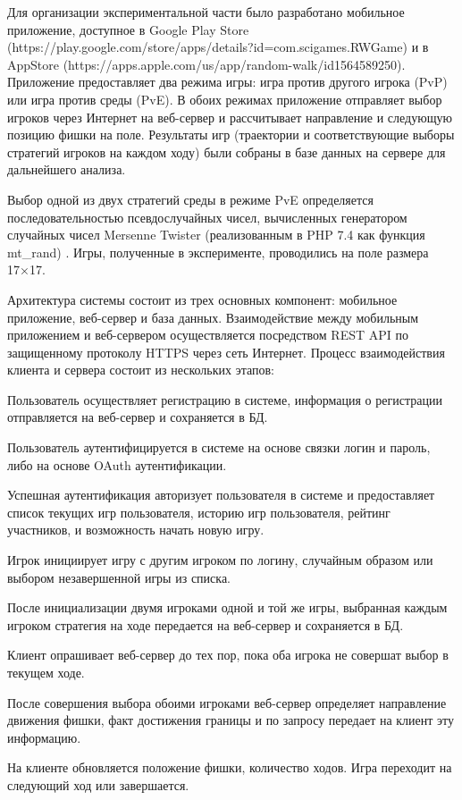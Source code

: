 Для организации экспериментальной части было разработано мобильное приложение, 
доступное в Google Play Store (https://play.google.com/store/apps/details?id=com.scigames.RWGame) и 
в AppStore (https://apps.apple.com/us/app/random-walk/id1564589250). Приложение предоставляет два режима игры: 
игра против другого игрока (PvP) или игра против среды (PvE). В обоих режимах приложение отправляет выбор игроков 
через Интернет на веб-сервер и рассчитывает направление и следующую позицию фишки на поле. Результаты игр 
(траектории и соответствующие выборы стратегий игроков на каждом ходу) были собраны в базе данных на сервере для дальнейшего анализа.

Выбор одной из двух стратегий среды в режиме PvE определяется последовательностью псевдослучайных чисел, 
вычисленных генератором случайных чисел Mersenne Twister (реализованным в PHP 7.4 как функция mt_rand) \cite{}. 
Игры, полученные в эксперименте, проводились на  поле размера 17×17.

Архитектура системы состоит из трех основных компонент: мобильное приложение, веб-сервер и база данных.
Взаимодействие между мобильным приложением и веб-сервером осуществляется посредством REST API по защищенному протоколу HTTPS
через сеть Интернет. Процесс взаимодействия клиента и сервера состоит из нескольких этапов:
\item Пользователь осуществляет регистрацию в системе, информация о регистрации отправляется на веб-сервер и сохраняется в БД.
\item Пользователь аутентифицируется в системе на основе связки логин и пароль, либо на основе OAuth аутентификации.
\item Успешная аутентификация авторизует пользователя в системе и предоставляет список текущих игр пользователя, историю игр пользователя, рейтинг участников, и возможность начать новую игру.
\item Игрок инициирует игру с другим игроком по логину, случайным образом или выбором незавершенной игры из списка.
\item После инициализации двумя игроками одной и той же игры, выбранная каждым игроком стратегия на ходе передается на веб-сервер и сохраняется в БД.
\item Клиент опрашивает веб-сервер до тех пор, пока оба игрока не совершат выбор в текущем ходе.
\item После совершения выбора обоими игроками веб-сервер определяет направление движения фишки, факт достижения границы и по запросу передает на клиент эту информацию.
\item На клиенте обновляется положение фишки, количество ходов. Игра переходит на следующий ход или завершается.

